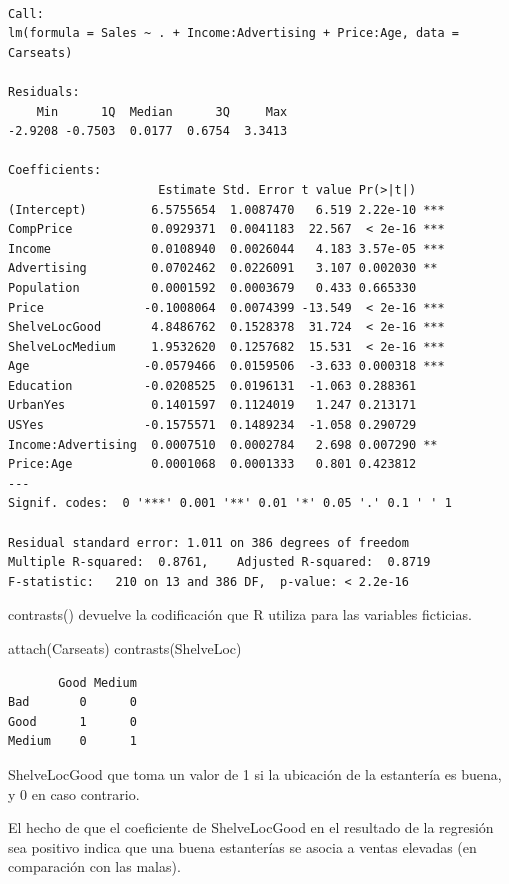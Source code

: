\documentclass[
  letterpaper,
  DIV=11,
  numbers=noendperiod]{scrartcl}
\newenvironment{Shaded}{\begin{snugshade}}{\end{snugshade}}
\newcommand{\FunctionTok}[1]{\textcolor[rgb]{0.28,0.35,0.67}{#1}}
\newcommand{\NormalTok}[1]{\textcolor[rgb]{0.00,0.23,0.31}{#1}}
\begin{document}
\begin{verbatim}

Call:
lm(formula = Sales ~ . + Income:Advertising + Price:Age, data = Carseats)

Residuals:
    Min      1Q  Median      3Q     Max 
-2.9208 -0.7503  0.0177  0.6754  3.3413 

Coefficients:
                     Estimate Std. Error t value Pr(>|t|)    
(Intercept)         6.5755654  1.0087470   6.519 2.22e-10 ***
CompPrice           0.0929371  0.0041183  22.567  < 2e-16 ***
Income              0.0108940  0.0026044   4.183 3.57e-05 ***
Advertising         0.0702462  0.0226091   3.107 0.002030 ** 
Population          0.0001592  0.0003679   0.433 0.665330    
Price              -0.1008064  0.0074399 -13.549  < 2e-16 ***
ShelveLocGood       4.8486762  0.1528378  31.724  < 2e-16 ***
ShelveLocMedium     1.9532620  0.1257682  15.531  < 2e-16 ***
Age                -0.0579466  0.0159506  -3.633 0.000318 ***
Education          -0.0208525  0.0196131  -1.063 0.288361    
UrbanYes            0.1401597  0.1124019   1.247 0.213171    
USYes              -0.1575571  0.1489234  -1.058 0.290729    
Income:Advertising  0.0007510  0.0002784   2.698 0.007290 ** 
Price:Age           0.0001068  0.0001333   0.801 0.423812    
---
Signif. codes:  0 '***' 0.001 '**' 0.01 '*' 0.05 '.' 0.1 ' ' 1

Residual standard error: 1.011 on 386 degrees of freedom
Multiple R-squared:  0.8761,    Adjusted R-squared:  0.8719 
F-statistic:   210 on 13 and 386 DF,  p-value: < 2.2e-16
\end{verbatim}

contrasts() devuelve la codificación que R utiliza para las variables
ficticias.

\begin{Shaded}
\begin{Highlighting}[]
\FunctionTok{attach}\NormalTok{(Carseats)}
\FunctionTok{contrasts}\NormalTok{(ShelveLoc)}
\end{Highlighting}
\end{Shaded}

\begin{verbatim}
       Good Medium
Bad       0      0
Good      1      0
Medium    0      1
\end{verbatim}

ShelveLocGood que toma un valor de 1 si la ubicación de la estantería es
buena, y 0 en caso contrario.

El hecho de que el coeficiente de ShelveLocGood en el resultado de la
regresión sea positivo indica que una buena estanterías se asocia a
ventas elevadas (en comparación con las malas).
\end{document}
